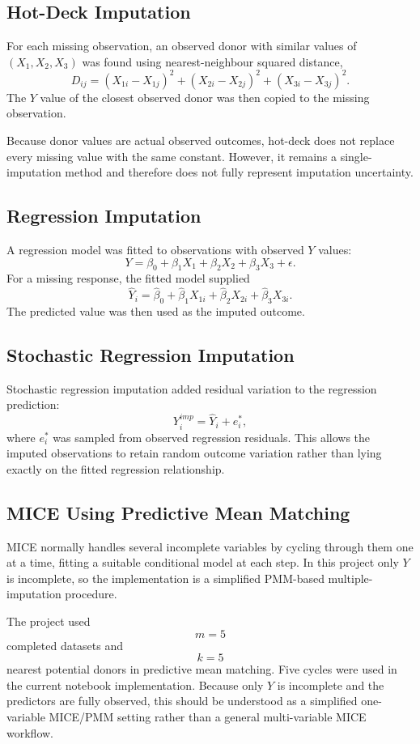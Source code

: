 \documentclass[11pt,a4paper]{article}
\begin{document}
\subsection{Hot-Deck Imputation}
For each missing observation, an observed donor with similar values of $(X_1,X_2,X_3)$ was found using nearest-neighbour squared distance,
\[
D_{ij}=(X_{1i}-X_{1j})^2+(X_{2i}-X_{2j})^2+(X_{3i}-X_{3j})^2.
\]
The $Y$ value of the closest observed donor was then copied to the missing observation.

Because donor values are actual observed outcomes, hot-deck does not replace every missing value with the same constant. However, it remains a single-imputation method and therefore does not fully represent imputation uncertainty.

\subsection{Regression Imputation}
A regression model was fitted to observations with observed $Y$ values:
\[
Y=\beta_0+\beta_1X_1+\beta_2X_2+\beta_3X_3+\epsilon.
\]
For a missing response, the fitted model supplied
\[
\hat Y_i=\hat\beta_0+\hat\beta_1X_{1i}+\hat\beta_2X_{2i}+\hat\beta_3X_{3i}.
\]
The predicted value was then used as the imputed outcome.

\subsection{Stochastic Regression Imputation}
Stochastic regression imputation added residual variation to the regression prediction:
\[
Y_i^{imp}=\hat Y_i+e_i^*,
\]
where $e_i^*$ was sampled from observed regression residuals. This allows the imputed observations to retain random outcome variation rather than lying exactly on the fitted regression relationship.

\subsection{MICE Using Predictive Mean Matching}
MICE normally handles several incomplete variables by cycling through them one at a time, fitting a suitable conditional model at each step. In this project only $Y$ is incomplete, so the implementation is a simplified PMM-based multiple-imputation procedure.

The project used
\[
m=5
\]
completed datasets and
\[
k=5
\]
nearest potential donors in predictive mean matching. Five cycles were used in the current notebook implementation. Because only $Y$ is incomplete and the predictors are fully observed, this should be understood as a simplified one-variable MICE/PMM setting rather than a general multi-variable MICE workflow.
\end{document}
